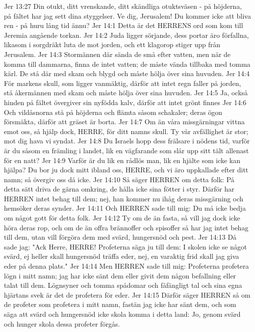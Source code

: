 Jer 13:27  Din otukt, ditt vrenskande, ditt skändliga otuktsväsen - på höjderna, på fältet har jag sett dina styggelser. Ve dig, Jerusalem! Du kommer icke att bliva ren - på huru lång tid ännu?
Jer 14:1  Detta är det HERRENS ord som kom till Jeremia angående torkan.
Jer 14:2  Juda ligger sörjande, dess portar äro förfallna, likasom i sorgdräkt luta de mot jorden, och ett klagorop stiger upp från Jerusalem.
Jer 14:3  Stormännen där sända de små efter vatten, men när de komma till dammarna, finna de intet vatten; de måste vända tillbaka med tomma kärl. De stå där med skam och blygd och måste hölja över sina huvuden.
Jer 14:4  För markens skull, som ligger vanmäktig, därför att intet regn faller på jorden, stå åkermännen med skam och måste hölja över sina huvuden.
Jer 14:5  Ja, också hinden på fältet övergiver sin nyfödda kalv, därför att intet grönt finnes
Jer 14:6  Och vildåsnorna stå på höjderna och flämta såsom schakaler; deras ögon försmäkta, därför att gräset är borta.
Jer 14:7  Om än våra missgärningar vittna emot oss, så hjälp dock, HERRE, för ditt namns skull. Ty vår avfällighet är stor; mot dig hava vi syndat.
Jer 14:8  Du Israels hopp dess frälsare i nödens tid, varför är du såsom en främling i landet, lik en vägfarande som slår upp sitt tält allenast för en natt?
Jer 14:9  Varför är du lik en rådlös man, lik en hjälte som icke kan hjälpa? Du bor ju dock mitt ibland oss, HERRE, och vi äro uppkallade efter ditt namn; så övergiv oss då icke.
Jer 14:10  Så säger HERREN om detta folk: På detta sätt driva de gärna omkring, de hålla icke sina fötter i styr. Därför har HERREN intet behag till dem; nej, han kommer nu ihåg deras missgärning och hemsöker deras synder.
Jer 14:11  Och HERREN sade till mig: Du må icke bedja om något gott för detta folk.
Jer 14:12  Ty om de än fasta, så vill jag dock icke höra deras rop, och om de än offra brännoffer och spisoffer så har jag intet behag till dem, utan vill förgöra dem med svärd, hungersnöd och pest.
Jer 14:13  Då sade jag: "Ack Herre, HERRE! Profeterna säga ju till dem: I skolen icke se något svärd, ej heller skall hungersnöd träffa eder, nej, en varaktig frid skall jag giva eder på denna plats."
Jer 14:14  Men HERREN sade till mig: Profeterna profetera lögn i mitt namn; jag har icke sänt dem eller givit dem någon befallning eller talat till dem. Lögnsyner och tomma spådomar och fåfängligt tal och sina egna hjärtans svek är det de profetera för eder.
Jer 14:15  Därför säger HERREN så om de profeter som profetera i mitt namn, fastän jag icke har sänt dem, och som säga att svärd och hungersnöd icke skola komma i detta land: Jo, genom svärd och hunger skola dessa profeter förgås.
